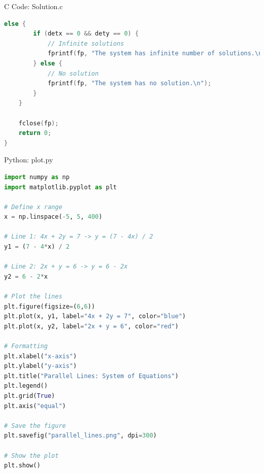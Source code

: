 \documentclass{beamer}
\numberwithin{equation}{section}
\theoremstyle{remark}
\begin{document}
\begin{frame}[fragile]{C Code: Solution.c}
\begin{lstlisting}[language=C]
    else {
        if (detx == 0 && dety == 0) {
            // Infinite solutions
            fprintf(fp, "The system has infinite number of solutions.\n");
        } else {
            // No solution
            fprintf(fp, "The system has no solution.\n");
        }
    }

    fclose(fp);
    return 0;
}

\end{lstlisting}
\end{frame}

\begin{frame}[fragile]{Python: plot.py}
\begin{lstlisting}[language=Python]
import numpy as np
import matplotlib.pyplot as plt

# Define x range
x = np.linspace(-5, 5, 400)

# Line 1: 4x + 2y = 7 -> y = (7 - 4x) / 2
y1 = (7 - 4*x) / 2

# Line 2: 2x + y = 6 -> y = 6 - 2x
y2 = 6 - 2*x

# Plot the lines
plt.figure(figsize=(6,6))
plt.plot(x, y1, label="4x + 2y = 7", color="blue")
plt.plot(x, y2, label="2x + y = 6", color="red")

# Formatting
plt.xlabel("x-axis")
plt.ylabel("y-axis")
plt.title("Parallel Lines: System of Equations")
plt.legend()
plt.grid(True)
plt.axis("equal")

# Save the figure
plt.savefig("parallel_lines.png", dpi=300)

# Show the plot
plt.show()

\end{lstlisting}
\end{frame}
\end{document}
